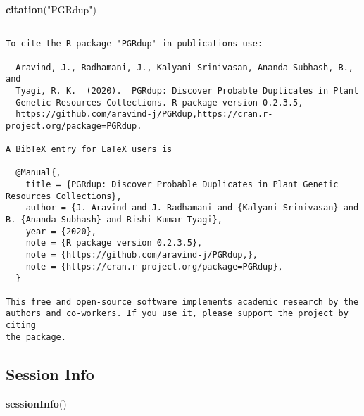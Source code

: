 \documentclass[
]{article}
\newenvironment{Shaded}{\begin{snugshade}}{\end{snugshade}}
\newcommand{\KeywordTok}[1]{\textcolor[rgb]{0.13,0.29,0.53}{\textbf{#1}}}
\newcommand{\NormalTok}[1]{#1}
\newcommand{\StringTok}[1]{\textcolor[rgb]{0.31,0.60,0.02}{#1}}
\begin{document}
\begin{Shaded}
\begin{Highlighting}[]
\KeywordTok{citation}\NormalTok{(}\StringTok{"PGRdup"}\NormalTok{)}
\end{Highlighting}
\end{Shaded}

\begin{verbatim}

To cite the R package 'PGRdup' in publications use:

  Aravind, J., Radhamani, J., Kalyani Srinivasan, Ananda Subhash, B., and
  Tyagi, R. K.  (2020).  PGRdup: Discover Probable Duplicates in Plant
  Genetic Resources Collections. R package version 0.2.3.5,
  https://github.com/aravind-j/PGRdup,https://cran.r-project.org/package=PGRdup.

A BibTeX entry for LaTeX users is

  @Manual{,
    title = {PGRdup: Discover Probable Duplicates in Plant Genetic Resources Collections},
    author = {J. Aravind and J. Radhamani and {Kalyani Srinivasan} and B. {Ananda Subhash} and Rishi Kumar Tyagi},
    year = {2020},
    note = {R package version 0.2.3.5},
    note = {https://github.com/aravind-j/PGRdup,},
    note = {https://cran.r-project.org/package=PGRdup},
  }

This free and open-source software implements academic research by the
authors and co-workers. If you use it, please support the project by citing
the package.
\end{verbatim}

\hypertarget{session-info}{%
\subsection{Session Info}\label{session-info}}

\begin{Shaded}
\begin{Highlighting}[]
\KeywordTok{sessionInfo}\NormalTok{()}
\end{Highlighting}
\end{Shaded}
\end{document}
